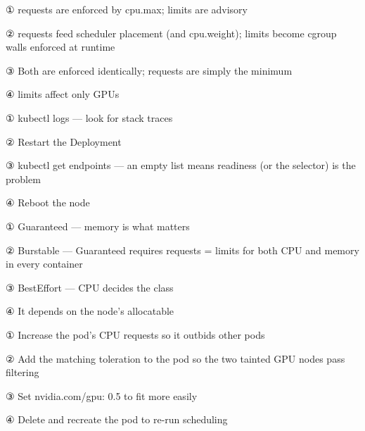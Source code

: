 
\begin{tbboptions}
  \item ① requests are enforced by cpu.max; limits are advisory
  \item ② requests feed scheduler placement (and cpu.weight); limits become cgroup walls enforced at runtime
  \item ③ Both are enforced identically; requests are simply the minimum
  \item ④ limits affect only GPUs
\end{tbboptions}


\begin{tbboptions}
  \item ① kubectl logs — look for stack traces
  \item ② Restart the Deployment
  \item ③ kubectl get endpoints — an empty list means readiness (or the selector) is the problem
  \item ④ Reboot the node
\end{tbboptions}


\begin{tbboptions}
  \item ① Guaranteed — memory is what matters
  \item ② Burstable — Guaranteed requires requests = limits for both CPU and memory in every container
  \item ③ BestEffort — CPU decides the class
  \item ④ It depends on the node's allocatable
\end{tbboptions}


\begin{tbboptions}
  \item ① Increase the pod's CPU requests so it outbids other pods
  \item ② Add the matching toleration to the pod so the two tainted GPU nodes pass filtering
  \item ③ Set nvidia.com/gpu: 0.5 to fit more easily
  \item ④ Delete and recreate the pod to re-run scheduling
\end{tbboptions}

